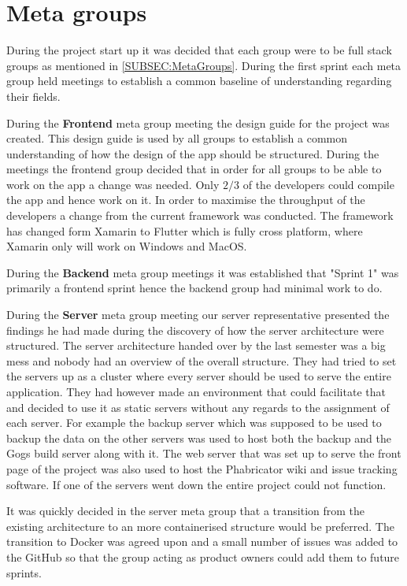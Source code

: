 \section{Meta groups}
During the project start up it was decided that each group were to be full stack groups as mentioned in \autoref{SUBSEC:MetaGroups}. 
During the first sprint each meta group held meetings to establish a common baseline of understanding regarding their fields. 

During the \textbf{Frontend} meta group meeting the design guide for the project was created. 
This design guide is used by all groups to establish a common understanding of how the design of the app should be structured. 
During the meetings the frontend group decided that in order for all groups to be able to work on the app a change was needed. 
Only $2/3$ of the developers could compile the app and hence work on it. 
In order to maximise the throughput of the developers a change from the current framework was conducted.
The framework has changed form Xamarin to Flutter which is fully cross platform, where Xamarin only will work on Windows and MacOS. 

During the \textbf{Backend} meta group meetings it was established that "Sprint 1" was primarily a frontend sprint hence the backend group had minimal work to do. 

During the \textbf{Server} meta group meeting our server representative presented the findings he had made during the discovery of how the server architecture were structured. 
The server architecture handed over by the last semester was a big mess and nobody had an overview of the overall structure.
They had tried to set the servers up as a cluster where every server should be used to serve the entire application. 
They had however made an environment that could facilitate that and decided to use it as static servers without any regards to the assignment of each server. 
For example the backup server which was supposed to be used to backup the data on the other servers was used to host both the backup and the Gogs build server along with it. 
The web server that was set up to serve the front page of the project was also used to host the Phabricator wiki and issue tracking software.
If one of the servers went down the entire project could not function. 

It was quickly decided in the server meta group that a transition from the existing architecture to an more containerised structure would be preferred. 
The transition to Docker was agreed upon and a small number of issues was added to the GitHub so that the group acting as product owners could add them to future sprints. 
